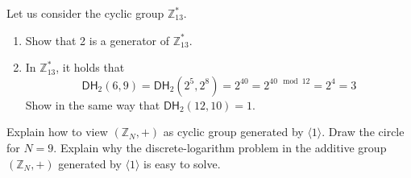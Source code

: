 \documentclass[a4paper,10pt,landscape,twocolumn]{scrartcl}
\begin{document}







\begin{exercise}
\begin{subex}
Let us consider the cyclic group $\mathbb{Z}_{13}^*$.
\begin{enumerate}
\item Show that 2 is a generator of $\mathbb{Z}_{13}^*$.
\item In $\mathbb{Z}_{13}^*$, it holds that 
\[
\mathsf{DH}_2(6,9) = \mathsf{DH}_2(2^5, 2^8) = 2^{40} = 2^{40 \mod 12} = 2^4 = 3
\]
Show in the same way that $\mathsf{DH}_2(12,10)=1$.
\end{enumerate}
\end{subex}

\begin{subex}
  Explain how to view $(\mathbb{Z}_N, +)$ as cyclic group generated by $\langle 1\rangle$. Draw the circle for $N=9$. Explain why the discrete-logarithm problem in the additive group $(\mathbb{Z}_N, +)$ generated by $\langle 1\rangle$ is easy to solve.
\end{subex}


\end{exercise}

\end{document}
